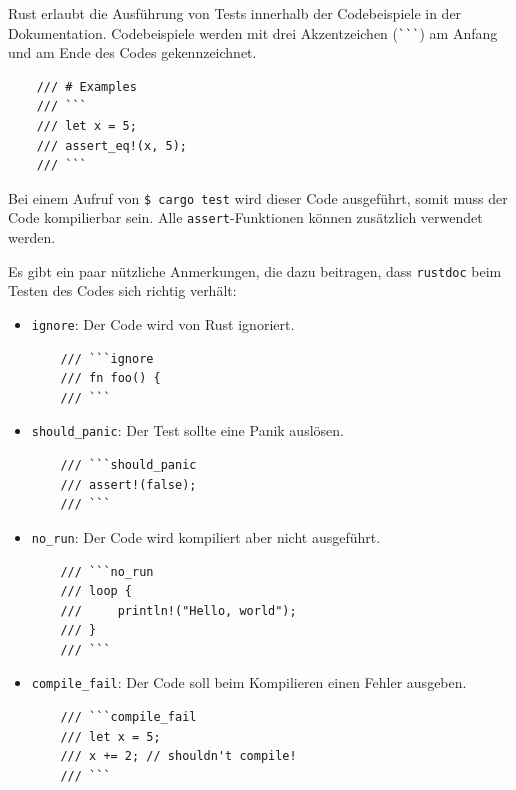Rust erlaubt die Ausführung von Tests innerhalb der Codebeispiele in der Dokumentation. Codebeispiele werden mit drei Akzentzeichen (\verb"```") am Anfang und am Ende des Codes gekennzeichnet.

\begin{lstlisting}
    /// # Examples
    /// ```
    /// let x = 5;
    /// assert_eq!(x, 5);
    /// ```
\end{lstlisting}

Bei einem Aufruf von \verb"$ cargo test" wird dieser Code ausgeführt, somit muss der Code kompilierbar sein. Alle \verb"assert"-Funktionen können zusätzlich verwendet werden.

Es gibt ein paar nützliche Anmerkungen, die dazu beitragen, dass \verb"rustdoc" beim Testen des Codes sich richtig verhält:

\begin{itemize}
    \item \verb"ignore": Der Code wird von Rust ignoriert.
\begin{lstlisting}
    /// ```ignore
    /// fn foo() {
    /// ```
\end{lstlisting}
\item \verb"should_panic": Der Test sollte eine Panik auslösen.
\begin{lstlisting}
    /// ```should_panic
    /// assert!(false);
    /// ```
\end{lstlisting}
\item \verb"no_run": Der Code wird kompiliert aber nicht ausgeführt.
\begin{lstlisting}
    /// ```no_run
    /// loop {
    ///     println!("Hello, world");
    /// }
    /// ```
\end{lstlisting}
\item \verb"compile_fail": Der Code soll beim Kompilieren einen Fehler ausgeben.
\begin{lstlisting}
    /// ```compile_fail
    /// let x = 5;
    /// x += 2; // shouldn't compile!
    /// ```
\end{lstlisting}
\end{itemize}
